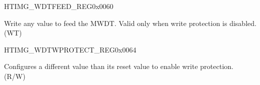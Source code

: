 \begin{register}{H}{TIMG\_WDTFEED\_REG}{0x0060}\label{regdesc:TIMGWDTFEEDREG}
%
\regnewline%
\begin{regdesc}\begin{reglist}
\label{fielddesc:TIMGWDTFEED}\item [TIMG\_WDT\_FEED] Write any value to feed the MWDT. Valid only when write protection is disabled. (WT)\\
\end{reglist}\end{regdesc}
\end{register}


\begin{register}{H}{TIMG\_WDTWPROTECT\_REG}{0x0064}\label{regdesc:TIMGWDTWPROTECTREG}
%
\regnewline%
\begin{regdesc}\begin{reglist}
\label{fielddesc:TIMGWDTWKEY}\item [TIMG\_WDT\_WKEY]Configures a different value than its reset value to enable write protection. (R/W)
\end{reglist}\end{regdesc}
\end{register}


